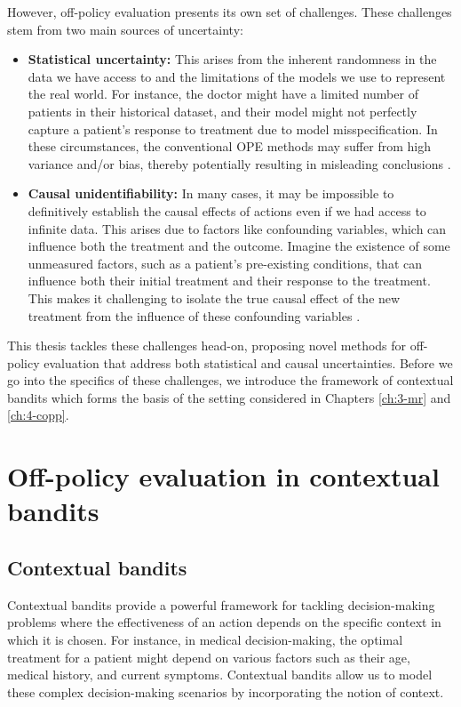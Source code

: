 However, off-policy evaluation presents its own set of challenges. These challenges stem from two main sources of uncertainty:

\begin{itemize}
    \item \textbf{Statistical uncertainty:} This arises from the inherent randomness in the data we have access to and the limitations of the models we use to represent the real world. 
    For instance, the doctor might have a limited number of patients in their historical dataset, and their model might not perfectly capture a patient's response to treatment due to model misspecification.
    In these circumstances, the conventional OPE methods may suffer from high variance and/or bias, thereby potentially resulting in misleading conclusions \citep{saito2021evaluating,su2020doubly,saito2022off}. 
    \item \textbf{Causal unidentifiability:} In many cases, it may be impossible to definitively establish the causal effects of actions even if we had access to infinite data. This arises due to factors like confounding variables, which can influence both the treatment and the outcome. Imagine the existence of some unmeasured factors, such as a patient's pre-existing conditions, that can influence both their initial treatment and their response to the treatment. This makes it challenging to isolate the true causal effect of the new treatment from the influence of these confounding variables \citep{tsiatis2019dynamic,kallus2018confounding,namkoong2020offpolicy}.
\end{itemize}
This thesis tackles these challenges head-on, proposing novel methods for off-policy evaluation that address both statistical and causal uncertainties.
Before we go into the specifics of these challenges, we introduce the framework of contextual bandits which forms the basis of the setting considered in Chapters \ref{ch:3-mr} and \ref{ch:4-copp}. 


\section{Off-policy evaluation in contextual bandits}
\subsection{Contextual bandits}
Contextual bandits \citep{Lattimore_Szepesvári_2020} provide a powerful framework for tackling decision-making problems where the effectiveness of an action depends on the specific context in which it is chosen. 
For instance, in medical decision-making, the optimal treatment for a patient might depend on various factors such as their age, medical history, and current symptoms. 
Contextual bandits allow us to model these complex decision-making scenarios by incorporating the notion of context.

